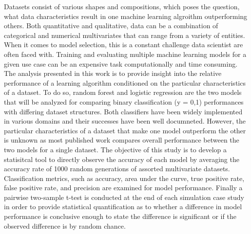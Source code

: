 \documentclass{llncs}
\begin{document}
Datasets consist of various shapes and compositions, which poses the question, what data characteristics result in one machine learning algroithm outperforming others. Both quantitative and qualitative, data can be a combination of categorical and numerical multivariates that can range from a variety of entities. When it comes to model selection, this is a constant challenge data scientist are often faced with. Training and evaluating multiple machine learning models for a given use case can be an expensive task computationally and time consuming. The analysis presented in this work is to provide insight into the relative performance of a learning algorithm conditioned on the particular characteristics of a dataset. To do so, random forest and logistic regression are the two models that will be analyzed for comparing binary classification (y = {0,1}) performances with differing dataset structures. Both classifiers have been widely implemented in various domains and their successes have been well documneted. However, the particular characteristics of a dataset that make one model outperform the other is unknown as most published work compares overall performance between the two models for a single dataset. The objective of this study is to develop a statisitcal tool to directly observe the accuracy of each model by averaging the accuracy rate of 1000 random generations of assorted multivariate datasets. Classification metrics, such as accuracy, area under the curve, true positive rate, false positive rate, and precision are examined for model performance. Finally a pairwise two-sample t-test is conducted at the end of each simulation case study in order to provide statistical quantification as to whether a difference in model performance is conclusive enough to state the difference is significant or if the observed difference is by random chance. 
\end{document}
